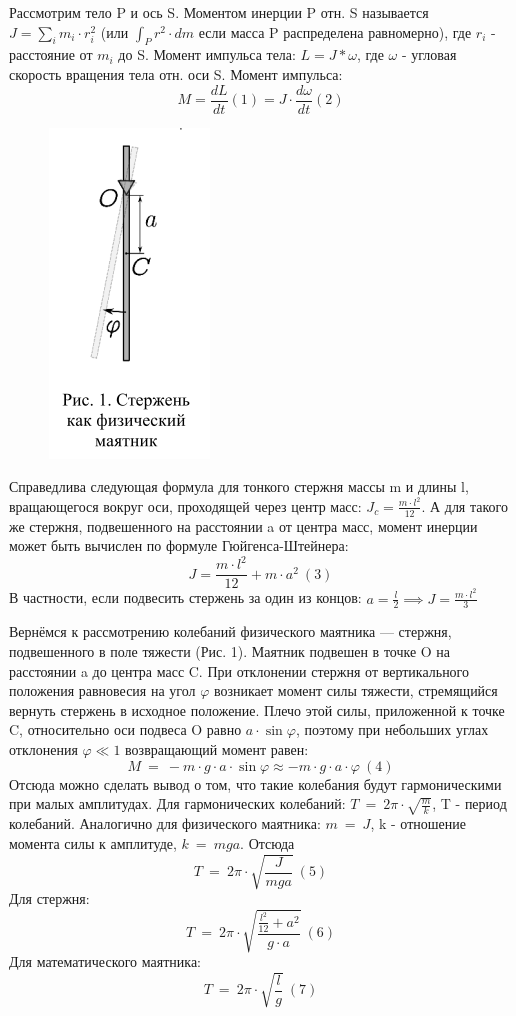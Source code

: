 \documentclass[a4paper,12pt]{article} %
\begin{document}
Рассмотрим тело P и ось S.
Моментом инерции P отн. S называется $J = \sum_i {m_i \cdot r_i^2}$ (или $\int_{P} {r^2 \cdot dm}$ если масса P распределена равномерно), где $r_i$ - расстояние от $m_i$ до S.
Момент импульса тела: $L = J*\omega$, где $\omega$ - угловая скорость вращения тела отн. оси S.
Момент импульса: \[M = \frac{dL}{dt} (1) = J \cdot \frac{d\omega}{dt} (2)\]

\begin{figure} [h]
\center
\includegraphics[scale=0.8]{./141/pic1.png}
\end{figure}

Справедлива следующая формула для тонкого стержня массы m и длины l, вращающегося вокруг оси, проходящей через центр масс: $J_c = \frac{m \cdot l^2}{12}$.
А для такого же стержня, подвешенного на расстоянии a от центра масс, момент инерции может быть вычислен по формуле Гюйгенса-Штейнера: \[J = \frac{m \cdot l^2}{12} + m \cdot a^2 \ (3)\]
В частности, если подвесить стержень за один из концов: $a = \frac{l}{2} \implies J = \frac{m \cdot l^2}{3}$

Вернёмся к рассмотрению колебаний физического маятника — стержня, подвешенного в поле тяжести (Рис. 1). Маятник подвешен в точке O на расстоянии a до центра масс C. При отклонении стержня от вертикального положения равновесия на угол $\varphi$ возникает момент силы тяжести, стремящийся вернуть стержень в исходное положение. Плечо этой
силы, приложенной к точке C, относительно оси подвеса O равно $a \cdot \sin{\varphi}$,
поэтому при небольших углах отклонения $\varphi \ll 1$ возвращающий момент
равен: \[M\ =\ -m \cdot g \cdot a \cdot \sin{\varphi} \approx -m \cdot g \cdot a \cdot \varphi \ (4)\]
Отсюда можно сделать вывод о том, что такие колебания будут гармоническими при малых амплитудах.
Для гармонических колебаний: $T\ =\ 2\pi \cdot \sqrt{\frac{m}{k}}$, T - период колебаний.
Аналогично для физического маятника: $m\ =\ J$, k - отношение момента силы к амплитуде, $k\ =\ mga$. Отсюда \[T\ =\ 2\pi \cdot \sqrt{\frac{J}{mga}} \ (5)\]
Для стержня: \[T\ =\ 2\pi \cdot \sqrt{\frac{\frac{l^2}{12} + a^2}{g \cdot a}} \ (6)\]
Для математического маятника: \[T\ =\ 2\pi \cdot \sqrt{\frac{l}{g}} \ (7)\]
\end{document}
